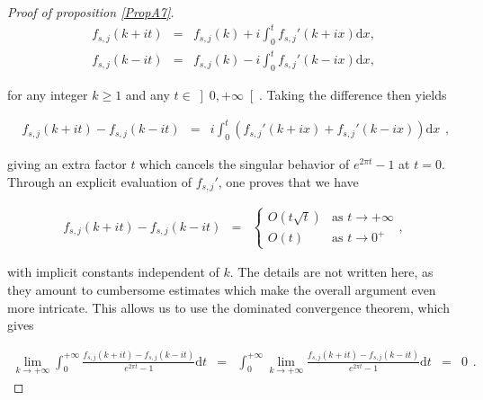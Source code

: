\documentclass{jams-l}
\theoremstyle{definition}
\theoremstyle{remark}
\numberwithin{equation}{section}
\begin{document}
\begin{proof}[Proof of proposition \ref{PropA7}]
                \[ \begin{array}{lll}
                        f_{s,j} \left( k + i t \right) & = & f_{s,j} \left( k \right) + i \int_0^t f_{s,j}' \left( k + ix \right) \mathrm{d}x, \\[0.5em]
                        
                        f_{s,j} \left( k - i t \right) & = & f_{s,j} \left( k \right) - i \int_0^t f_{s,j}' \left( k - ix \right) \mathrm{d}x,
                    \end{array} \]
                
                \noindent for any integer $k \geqslant 1$ and any $t \in \left] 0, + \infty \right[$. Taking the difference then yields
                
                \[ \begin{array}{lll}
                        f_{s,j} \left( k + i t \right) - f_{s,j} \left( k - i t \right) & = & i \int_0^t \left( f_{s,j}' \left( k + ix \right) + f_{s,j}' \left( k - ix \right) \right) \mathrm{d}x
                    \end{array} , \]
                
                \noindent giving an extra factor $t$ which cancels the singular behavior of $e^{2 \pi t} - 1$ at $t = 0$. Through an explicit evaluation of $f_{s,j}'$, one proves that we have
                
                \begin{equation}
                \label{EqHypothesisRamanujan}
                    \begin{array}{lll}
                        f_{s,j} \left( k + i t \right) - f_{s,j} \left( k - i t \right) & = & \left \{ \begin{array}{ll} O \left( t \sqrt{t} \right) & \text{as } t \rightarrow + \infty \\[0.5em] O \left( t \right) & \text{as } t \rightarrow 0^+ \end{array} \right.,
                    \end{array}
                \end{equation}
                
                \noindent with implicit constants independent of $k$. The details are not written here, as they amount to cumbersome estimates which make the overall argument even more intricate. This allows us to use the dominated convergence theorem, which gives
                
                \[ \begin{array}{lllll}
                        \lim\limits_{k \rightarrow + \infty} \int_0^{+ \infty} \frac{f_{s,j} \left( k + i t \right) - f_{s,j} \left( k - i t \right)}{e^{2 \pi t} - 1} \mathrm{d}t & = & \int_0^{+ \infty} \lim\limits_{k \rightarrow + \infty} \frac{f_{s,j} \left( k + i t \right) - f_{s,j} \left( k - i t \right)}{e^{2 \pi t} - 1} \mathrm{d}t & = & 0
                    \end{array} . \]
                

\end{proof}
\end{document}
